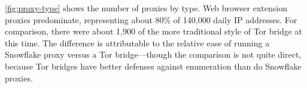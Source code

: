 \documentclass[letterpaper,twocolumn]{article}
\begin{document}
\autoref{fig:proxy-type} shows the number of proxies by type.
Web browser extension proxies predominate,
representing about 80\%
of 140,000 daily IP addresses.
For comparison, there were about 1,900
of the more traditional style of Tor bridge at this time.
The difference is attributable to the relative ease
of running a Snowflake proxy versus a Tor bridge---though
the comparison is not quite direct,
because Tor bridges have better defenses
against enumeration than do Snowflake proxies.
\end{document}
